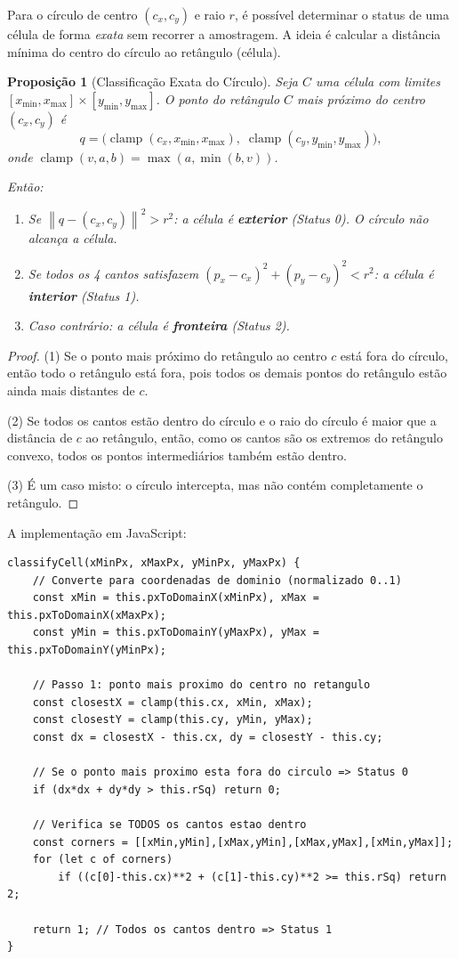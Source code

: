 \documentclass[11pt,a4paper]{article}
\theoremstyle{plain}
\newtheorem{proposition}[theorem]{Proposição}
\theoremstyle{definition}
\newcommand{\norm}[1]{\left\|#1\right\|}
\begin{document}
Para o círculo de centro $(c_x, c_y)$ e raio $r$, é possível determinar o status
de uma célula de forma \emph{exata} sem recorrer a amostragem. A ideia é calcular
a distância mínima do centro do círculo ao retângulo (célula).

\begin{proposition}[Classificação Exata do Círculo]
Seja $C$ uma célula com limites $[x_{\min}, x_{\max}] \times [y_{\min}, y_{\max}]$.
O ponto do retângulo $C$ mais próximo do centro $(c_x, c_y)$ é
\[
    q = \bigl(\operatorname{clamp}(c_x, x_{\min}, x_{\max}),\;
              \operatorname{clamp}(c_y, y_{\min}, y_{\max})\bigr),
\]
onde $\operatorname{clamp}(v, a, b) = \max(a, \min(b, v))$.

Então:
\begin{enumerate}
    \item Se $\norm{q - (c_x, c_y)}^2 > r^2$: a célula é \textbf{exterior} (Status 0). O círculo não alcança a célula.
    \item Se todos os 4 cantos satisfazem $(p_x - c_x)^2 + (p_y - c_y)^2 < r^2$: a célula é \textbf{interior} (Status 1).
    \item Caso contrário: a célula é \textbf{fronteira} (Status 2).
\end{enumerate}
\end{proposition}

\begin{proof}
(1) Se o ponto mais próximo do retângulo ao centro $c$ está fora do círculo, então
todo o retângulo está fora, pois todos os demais pontos do retângulo estão ainda
mais distantes de $c$.

(2) Se todos os cantos estão dentro do círculo e o raio do círculo é maior que
a distância de $c$ ao retângulo, então, como os cantos são os extremos do
retângulo convexo, todos os pontos intermediários também estão dentro.

(3) É um caso misto: o círculo intercepta, mas não contém completamente o
retângulo.
\end{proof}

A implementação em JavaScript:
\begin{lstlisting}
classifyCell(xMinPx, xMaxPx, yMinPx, yMaxPx) {
    // Converte para coordenadas de dominio (normalizado 0..1)
    const xMin = this.pxToDomainX(xMinPx), xMax = this.pxToDomainX(xMaxPx);
    const yMin = this.pxToDomainY(yMaxPx), yMax = this.pxToDomainY(yMinPx);

    // Passo 1: ponto mais proximo do centro no retangulo
    const closestX = clamp(this.cx, xMin, xMax);
    const closestY = clamp(this.cy, yMin, yMax);
    const dx = closestX - this.cx, dy = closestY - this.cy;

    // Se o ponto mais proximo esta fora do circulo => Status 0
    if (dx*dx + dy*dy > this.rSq) return 0;

    // Verifica se TODOS os cantos estao dentro
    const corners = [[xMin,yMin],[xMax,yMin],[xMax,yMax],[xMin,yMax]];
    for (let c of corners)
        if ((c[0]-this.cx)**2 + (c[1]-this.cy)**2 >= this.rSq) return 2;

    return 1; // Todos os cantos dentro => Status 1
}
\end{lstlisting}
\end{document}
